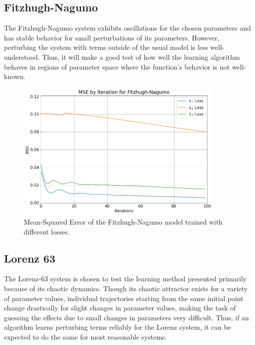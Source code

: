\documentclass[12pt]{article}
\begin{document}
\subsection{Fitzhugh-Nagumo}

The Fitzhugh-Nagumo system exhibits oscillations for the chosen parameters and has stable behavior for small perturbations of its parameters.\cite{ramsay} However, perturbing the system with terms outside of the usual model is less well-understood. Thus, it will make a good test of how well the learning algorithm behaves in regions of parameter space where the function's behavior is not well-known.

\begin{figure}[ht]
  \centering
  \includegraphics[width=0.9\textwidth]{mse-fn.png}
  \caption{Mean-Squared Error of the Fitzhugh-Nagumo model trained with different losses.}
\end{figure}



\subsection{Lorenz 63}

The Lorenz-63 system is chosen to test the learning method presented primarily because of its chaotic dynamics. Though its chaotic attractor exists for a variety of parameter values, individual trajectories starting from the same initial point change drastically for slight changes in parameter values, making the task of guessing the effects due to small changes in parameters very difficult. Thus, if an algorithm learns perturbing terms reliably for the Lorenz system, it can be expected to do the same for most reasonable systems.
\end{document}
